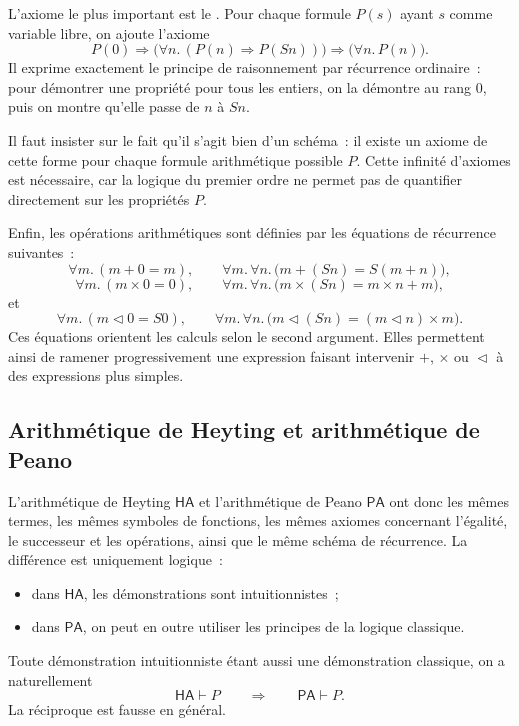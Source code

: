\thingy
L'axiome le plus important est le .  Pour
chaque formule $P(s)$ ayant $s$ comme variable libre, on ajoute l'axiome
\[
P(0)
\Rightarrow
\bigl(\forall n.\,(P(n)\Rightarrow P(Sn))\bigr)
\Rightarrow
\bigl(\forall n.\,P(n)\bigr).
\]
Il exprime exactement le principe de raisonnement par récurrence
ordinaire : pour démontrer une propriété pour tous les entiers, on la
démontre au rang $0$, puis on montre qu'elle passe de $n$ à $Sn$.

Il faut insister sur le fait qu'il s'agit bien d'un schéma : il existe un
axiome de cette forme pour chaque formule arithmétique possible $P$.
Cette infinité d'axiomes est nécessaire, car la logique du premier ordre
ne permet pas de quantifier directement sur les propriétés $P$.

\thingy
Enfin, les opérations arithmétiques sont définies par les équations de
récurrence suivantes :
\[
\forall m.\,(m+0=m),
\qquad
\forall m.\,\forall n.\,\bigl(m+(Sn)=S(m+n)\bigr),
\]
\[
\forall m.\,(m\times0=0),
\qquad
\forall m.\,\forall n.\,
\bigl(m\times(Sn)=m\times n+m\bigr),
\]
et
\[
\forall m.\,(m\vartriangleleft0=S0),
\qquad
\forall m.\,\forall n.\,
\bigl(m\vartriangleleft(Sn)=(m\vartriangleleft n)\times m\bigr).
\]
Ces équations orientent les calculs selon le second argument.  Elles
permettent ainsi de ramener progressivement une expression faisant
intervenir $+$, $\times$ ou $\vartriangleleft$ à des expressions plus
simples.

\subsection{Arithmétique de Heyting et arithmétique de Peano}

\thingy
L'arithmétique de Heyting $\mathsf{HA}$ et l'arithmétique de Peano
$\mathsf{PA}$ ont donc les mêmes termes, les mêmes symboles de
fonctions, les mêmes axiomes concernant l'égalité, le successeur et les
opérations, ainsi que le même schéma de récurrence.  La différence est
uniquement logique :
\begin{itemize}
\item dans $\mathsf{HA}$, les démonstrations sont intuitionnistes ;
\item dans $\mathsf{PA}$, on peut en outre utiliser les principes de la
  logique classique.
\end{itemize}

Toute démonstration intuitionniste étant aussi une démonstration
classique, on a naturellement
\[
\mathsf{HA}\vdash P
\qquad\Longrightarrow\qquad
\mathsf{PA}\vdash P.
\]
La réciproque est fausse en général.

